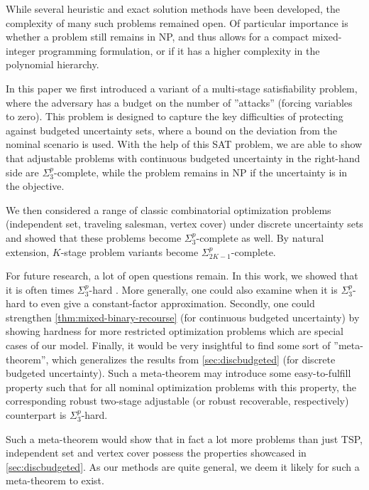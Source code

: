While several heuristic and exact solution methods have been developed, the complexity of many such problems remained open. Of particular importance is whether a problem still remains in NP, and thus allows for a compact mixed-integer programming formulation, or if it has a higher complexity in the polynomial hierarchy. 

In this paper we first introduced a variant of a multi-stage satisfiability problem, where the adversary has a budget on the number of ''attacks'' (forcing variables to zero). This problem is designed to capture the key difficulties of protecting against budgeted uncertainty sets, where a bound on the deviation from the nominal scenario is used. With the help of this SAT problem, we are able to show that adjustable problems with continuous budgeted uncertainty in the right-hand side are $\Sigma^p_3$-complete, while the problem remains in NP if the uncertainty is in the objective.

We then considered a range of classic combinatorial optimization problems (independent set, traveling salesman, vertex cover) under discrete uncertainty sets and showed that these problems become $\Sigma^p_3$-complete as well. By natural extension, $K$-stage problem variants become $\Sigma^p_{2K-1}$-complete.

For future research, a lot of open questions remain. In this work, we showed that it is often times $\Sigma^p_3$-hard . More generally, one could also examine when it is $\Sigma^p_3$-hard to even give a constant-factor approximation.
Secondly, one could strengthen \cref{thm:mixed-binary-recourse} (for continuous budgeted uncertainty) by showing hardness for more restricted optimization problems which are special cases of our model.
Finally, it would be very insightful to find some sort of ''meta-theorem'', which generalizes the results from \cref{sec:discbudgeted} (for discrete budgeted uncertainty). 
Such a meta-theorem may introduce some easy-to-fulfill property such that for all nominal optimization problems with this property, the corresponding robust two-stage adjustable (or robust recoverable, respectively)  counterpart is $\Sigma^p_3$-hard. 

Such a meta-theorem would show that in fact a lot more problems than just TSP, independent set and vertex cover possess the properties showcased in \cref{sec:discbudgeted}. As our methods are quite general, we deem it likely for such a meta-theorem to exist. 


